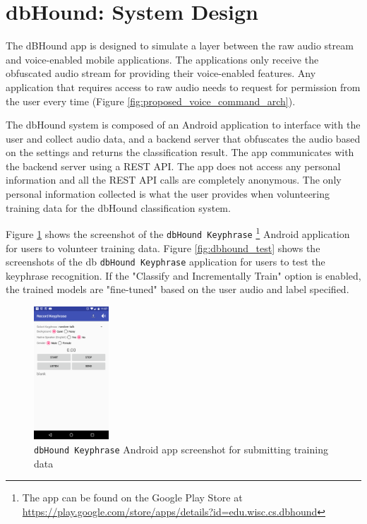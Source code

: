 
\section{dbHound: System Design}
\label{sec:system_design}

The dBHound app is designed to simulate a layer between the raw audio stream and voice-enabled mobile applications.
 The applications only receive the obfuscated audio stream for providing their voice-enabled features.
 Any application that requires access to raw audio needs to request for permission from the user every time (Figure \ref{fig:proposed_voice_command_arch}).


The dbHound system is composed of an Android application to interface with the user and collect audio data, and a backend server that obfuscates the audio based on the settings and returns the classification result.
 The app communicates with the backend server using a REST API.
 The app does not access any personal information and all the REST API calls are completely anonymous.
 The only personal information collected is what the user provides when volunteering training data for the dbHound classification system.


Figure \ref{fig:dbhound_submit} shows the screenshot of the \texttt{dbHound Keyphrase} \footnote{The app can be found on the Google Play Store at \url{https://play.google.com/store/apps/details?id=edu.wisc.cs.dbhound}} Android application for users to volunteer training data.
 Figure \ref{fig:dbhound_test} shows the screenshots of the db \texttt{dbHound Keyphrase} application for users to test the keyphrase recognition.
 If the "Classify and Incrementally Train" option is enabled, the trained models are "fine-tuned" based on the user audio and label specified.

\begin{figure}[!th]
\centering
\includegraphics[width=0.25\textwidth]{sound/app_submit.png}
\caption{\texttt{dbHound Keyphrase} Android app screenshot for submitting training data}
\label{fig:dbhound_submit}
\end{figure}

